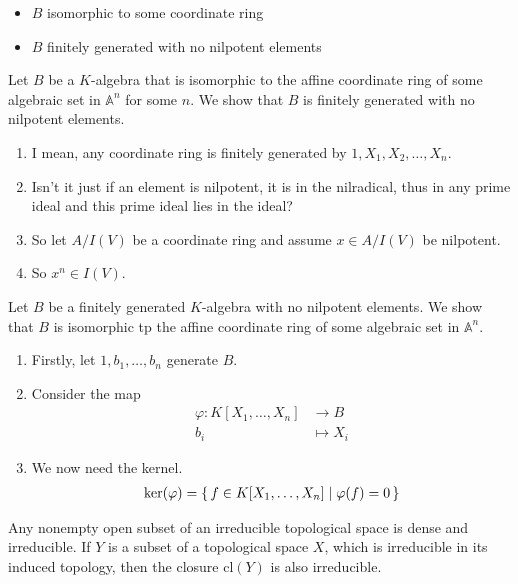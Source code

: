 \begin{solution}
    \begin{itemize}
        \item \(B\) isomorphic to some coordinate ring
        \item \(B\) finitely generated with no nilpotent elements
    \end{itemize}

    Let \(B\) be a \(K\)-algebra that is isomorphic to the affine coordinate ring of some algebraic set in \(\mathbb{A}^n\) for some \(n\). We show that \(B\) is finitely generated with no nilpotent elements.
    \begin{enumerate}
        \item I mean, any coordinate ring is finitely generated by \(1, X_1, X_2, \ldots, X_n\).
        \item Isn't it just if an element is nilpotent, it is in the nilradical, thus in any prime ideal and this prime ideal lies in the ideal?
        \item So let \(A / I(V)\) be a coordinate ring and assume \(x \in A / I(V)\) be nilpotent.
        \item So \(x^n \in I(V)\).
    \end{enumerate}

    Let \(B\) be a finitely generated \(K\)-algebra with no nilpotent elements. We show that \(B\) is isomorphic tp the affine coordinate ring of some algebraic set in \(\mathbb{A}^n\).
    \begin{enumerate}
        \item Firstly, let \(1, b_1, \ldots, b_n\) generate \(B\).
        \item Consider the map
        \begin{align*}
            \varphi: K[X_1, \ldots, X_n] &\rightarrow B \\
            b_i &\mapsto X_i
        \end{align*}
        \item We now need the kernel.
        \begin{align*}
            \text{ker}(\varphi) = \left\{\, f \in K[X_1, \ldots, X_n] \mathrel{\mid} \varphi(f) = 0 \,\right\}
        \end{align*}
    \end{enumerate}
\end{solution}
%
%
\begin{exercise}[1.6.]
    Any nonempty open subset of an irreducible topological space is dense and irreducible. If \(Y\) is a subset of a topological space \(X\), which is irreducible in its induced topology, then the closure \(\text{cl}(Y)\) is also irreducible.
\end{exercise}
